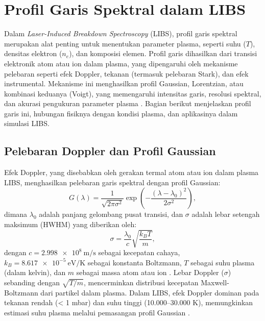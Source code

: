 \section{Profil Garis Spektral dalam LIBS}

Dalam \textit{Laser-Induced Breakdown Spectroscopy} (LIBS), profil garis spektral merupakan alat penting untuk menentukan parameter plasma, seperti suhu (\( T \)), densitas elektron (\( n_e \)), dan komposisi elemen. Profil garis dihasilkan dari transisi elektronik atom atau ion dalam plasma, yang dipengaruhi oleh mekanisme pelebaran seperti efek Doppler, tekanan (termasuk pelebaran Stark), dan efek instrumental. Mekanisme ini menghasilkan profil Gaussian, Lorentzian, atau kombinasi keduanya (Voigt), yang memengaruhi intensitas garis, resolusi spektral, dan akurasi pengukuran parameter plasma \citep{Demtroder2010,Griem1997}. Bagian berikut menjelaskan profil garis ini, hubungan fisiknya dengan kondisi plasma, dan aplikasinya dalam simulasi LIBS.

\subsection{Pelebaran Doppler dan Profil Gaussian}
Efek Doppler, yang disebabkan oleh gerakan termal atom atau ion dalam plasma LIBS, menghasilkan pelebaran garis spektral dengan profil Gaussian:
\begin{equation}
G(\lambda) = \frac{1}{\sqrt{2\pi \sigma^2}} \exp\left(-\frac{(\lambda - \lambda_0)^2}{2\sigma^2}\right), \label{eq:gaussian}
\end{equation}
dimana \( \lambda_0 \) adalah panjang gelombang pusat transisi, dan \( \sigma \) adalah lebar setengah maksimum (HWHM) yang diberikan oleh:
\begin{equation}
\sigma = \frac{\lambda_0}{c} \sqrt{\frac{k_B T}{m}}, \label{eq:sigma_doppler}
\end{equation}
dengan \( c = \SI{2.998e8}{\meter\per\second} \) sebagai kecepatan cahaya, \( k_B = \SI{8.617e-5}{\electronvolt\per\kelvin} \) sebagai konstanta Boltzmann, \( T \) sebagai suhu plasma (dalam kelvin), dan \( m \) sebagai massa atom atau ion \citep{Demtroder2010}. Lebar Doppler (\( \sigma \)) sebanding dengan \( \sqrt{T/m} \), mencerminkan distribusi kecepatan Maxwell-Boltzmann dari partikel dalam plasma. Dalam LIBS, efek Doppler dominan pada tekanan rendah (< 1 mbar) dan suhu tinggi (10.000–30.000 K), memungkinkan estimasi suhu plasma melalui pemasangan profil Gaussian \citep{Miziolek2006}.

